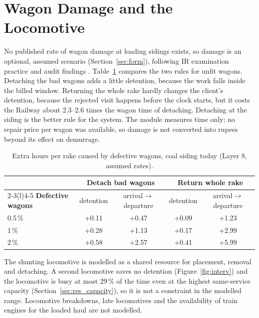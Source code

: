 \section{Wagon Damage and the Locomotive}
\label{sec:res_damage}
No published rate of wagon damage at loading sidings exists, so damage is an optional, assumed scenario (Section~\ref{sec:form}), following IR examination practice and audit findings \cite{irimee, cag}. Table~\ref{tab:dmg} compares the two rules for unfit wagons. Detaching the bad wagons adds a little detention, because the work falls inside the billed window. Returning the whole rake hardly changes the client's detention, because the rejected visit happens before the clock starts, but it costs the Railway about 2.3--2.6 times the wagon time of detaching. Detaching at the siding is the better rule for the system. The module measures time only; no repair price per wagon was available, so damage is not converted into rupees beyond its effect on demurrage.

\begin{table}[!htbp]
\centering
\caption[Extra hours per rake caused by defective wagons, coal siding today]{Extra hours per rake caused by defective wagons, coal siding today (Layer 8, assumed rates).}
\label{tab:dmg}
\small
\begin{tabular}{@{}lcccc@{}}
\toprule
 & \multicolumn{2}{c}{\textbf{Detach bad wagons}} & \multicolumn{2}{c}{\textbf{Return whole rake}} \\
\cmidrule(lr){2-3}\cmidrule(l){4-5}
\textbf{Defective wagons} & detention & arrival$\to$departure & detention & arrival$\to$departure \\
\midrule
0.5\,\% & +0.11 & +0.47 & +0.09 & +1.23 \\
1\,\% & +0.28 & +1.13 & +0.17 & +2.99 \\
2\,\% & +0.58 & +2.57 & +0.41 & +5.99 \\
\bottomrule
\end{tabular}
\end{table}

The shunting locomotive is modelled as a shared resource for placement, removal and detaching. A second locomotive saves no detention (Figure~\ref{fig:interv}) and the locomotive is busy at most 29\,\% of the time even at the highest same-service capacity (Section~\ref{sec:res_capacity}), so it is not a constraint in the modelled range. Locomotive breakdowns, late locomotives and the availability of train engines for the loaded haul are not modelled.

